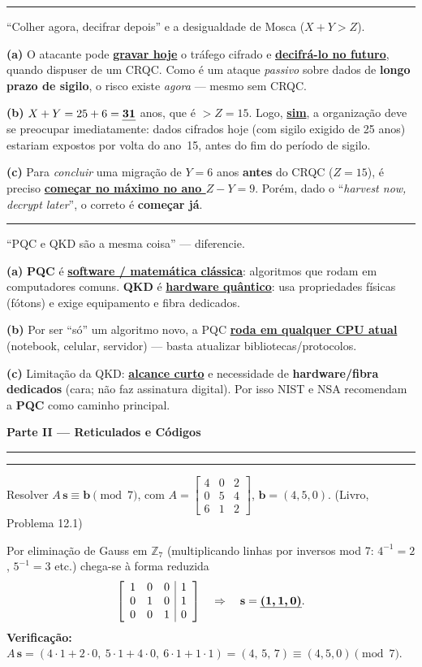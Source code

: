 \documentclass[11pt,a4paper]{article}
\newcommand{\livro}[1]{{\footnotesize\color{black!50}(Livro, Problema #1)}}
\newcommand{\alert}[1]{\textbf{\uline{#1}}}
\newcommand{\parte}[1]{%
    \par\vspace{1.6em}\noindent
    {\large\bfseries\color{red!55!black}#1}%
    \par\nobreak\vspace{-0.4em}\noindent
    {\color{red!45!black}\rule{\linewidth}{1.0pt}}%
    \par\nobreak\vspace{0.2em}
}
\newcommand{\exercicio}[1]{%
    \Needspace{8\baselineskip}%
    \par\vspace{1.2em}
    \noindent
    {\color{black!55}\rule[-0.25em]{3pt}{1.6em}}%
    \hspace{0.6em}{\Large\bfseries Exerc\'{i}cio #1}
    \par\vspace{-0.4em}
    \noindent{\color{black!35}\rule{\textwidth}{0.4pt}}
    \par\vspace{0.35em}
}
\newenvironment{resposta}{%
    \begin{respostabox}
    \color{red!70!black}\sloppy
}{%
    \end{respostabox}
}
\begin{document}
\exercicio{2}
``Colher agora, decifrar depois'' e a desigualdade de Mosca ($X+Y>Z$).\begin{resposta}
\textbf{(a)} O atacante pode \alert{gravar hoje} o tr\'{a}fego cifrado e \alert{decifr\'{a}-lo no futuro}, quando dispuser de um CRQC. Como \'{e} um ataque \emph{passivo} sobre dados de \textbf{longo prazo de sigilo}, o risco existe \emph{agora} --- mesmo sem CRQC.

\textbf{(b)} $X + Y = 25 + 6 = \alert{31}$ anos, que \'{e} $> Z = 15$. Logo, \alert{sim}, a organiza\c{c}\~{a}o deve se preocupar imediatamente: dados cifrados hoje (com sigilo exigido de 25 anos) estariam expostos por volta do ano~15, antes do fim do per\'{i}odo de sigilo.

\textbf{(c)} Para \emph{concluir} uma migra\c{c}\~{a}o de $Y=6$ anos \textbf{antes} do CRQC ($Z=15$), \'{e} preciso \alert{come\c{c}ar no m\'{a}ximo no ano $Z - Y = 9$}. Por\'{e}m, dado o ``\textit{harvest now, decrypt later}'', o correto \'{e} \textbf{come\c{c}ar j\'{a}}.
\end{resposta}

\exercicio{3}
``PQC e QKD s\~{a}o a mesma coisa'' --- diferencie.\begin{resposta}
\textbf{(a)} \textbf{PQC} \'{e} \alert{software / matem\'{a}tica cl\'{a}ssica}: algoritmos que rodam em computadores comuns. \textbf{QKD} \'{e} \alert{hardware qu\^{a}ntico}: usa propriedades f\'{i}sicas (f\'{o}tons) e exige equipamento e fibra dedicados.

\textbf{(b)} Por ser ``s\'{o}'' um algoritmo novo, a PQC \alert{roda em qualquer CPU atual} (notebook, celular, servidor) --- basta atualizar bibliotecas/protocolos.

\textbf{(c)} Limita\c{c}\~{a}o da QKD: \alert{alcance curto} e necessidade de \textbf{hardware/fibra dedicados} (cara; n\~{a}o faz assinatura digital). Por isso NIST e NSA recomendam a \textbf{PQC} como caminho principal.
\end{resposta}

\parte{Parte II --- Reticulados e C\'{o}digos}

\exercicio{4}
Resolver $A\,\mathbf{s}\equiv\mathbf{b}\pmod 7$, com $A=\left[\begin{smallmatrix}4&0&2\\0&5&4\\6&1&2\end{smallmatrix}\right]$, $\mathbf{b}=(4,5,0)$. \livro{12.1}
\begin{resposta}
Por elimina\c{c}\~{a}o de Gauss em $\mathbb{Z}_7$ (multiplicando linhas por inversos mod 7: $4^{-1}=2$, $5^{-1}=3$ etc.) chega-se \`{a} forma reduzida
\[
\left[\begin{array}{ccc|c}1&0&0&1\\0&1&0&1\\0&0&1&0\end{array}\right]
\quad\Rightarrow\quad \mathbf{s} = \alert{(1,\,1,\,0)}.
\]
\textbf{Verifica\c{c}\~{a}o:} $A\,\mathbf{s} = (4\cdot1+2\cdot0,\ 5\cdot1+4\cdot0,\ 6\cdot1+1\cdot1) = (4,\,5,\,7)\equiv(4,5,0)\pmod 7$. \checkmark
\end{resposta}
\end{document}
